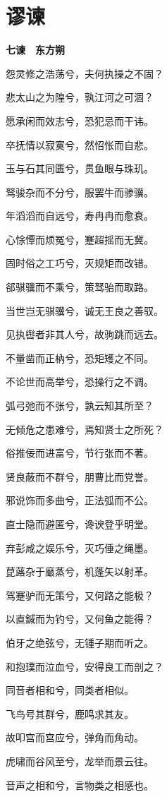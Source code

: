 \documentclass[12pt,a4paper]{ctexbook}
\begin{document}
\section{谬谏}
\textbf{七谏　东方朔}\par\vspace{0.5em}
怨灵修之浩荡兮，夫何执操之不固？\par
悲太山之为隍兮，孰江河之可涸？\par
愿承闲而效志兮，恐犯忌而干讳。\par
卒抚情以寂寞兮，然怊怅而自悲。\par
玉与石其同匮兮，贯鱼眼与珠玑。\par
驽骏杂而不分兮，服罢牛而骖骥。\par
年滔滔而自远兮，寿冉冉而愈衰。\par
心悇憛而烦冤兮，蹇超摇而无冀。\par
固时俗之工巧兮，灭规矩而改错。\par
郤骐骥而不乘兮，策驽骀而取路。\par
当世岂无骐骥兮，诚无王良之善驭。\par
见执辔者非其人兮，故驹跳而远去。\par
不量凿而正枘兮，恐矩矱之不同。\par
不论世而高举兮，恐操行之不调。\par
弧弓弛而不张兮，孰云知其所至？\par
无倾危之患难兮，焉知贤士之所死？\par
俗推佞而进富兮，节行张而不著。\par
贤良蔽而不群兮，朋曹比而党誉。\par
邪说饰而多曲兮，正法弧而不公。\par
直士隐而避匿兮，谗谀登乎明堂。\par
弃彭咸之娱乐兮，灭巧倕之绳墨。\par
菎蕗杂于黀蒸兮，机蓬矢以射革。\par
驾蹇驴而无策兮，又何路之能极？\par
以直鍼而为钓兮，又何鱼之能得？\par
伯牙之绝弦兮，无锺子期而听之。\par
和抱璞而泣血兮，安得良工而剖之？\par
同音者相和兮，同类者相似。\par
飞鸟号其群兮，鹿鸣求其友。\par
故叩宫而宫应兮，弹角而角动。\par
虎啸而谷风至兮，龙举而景云往。\par
音声之相和兮，言物类之相感也。\par
\end{document}
